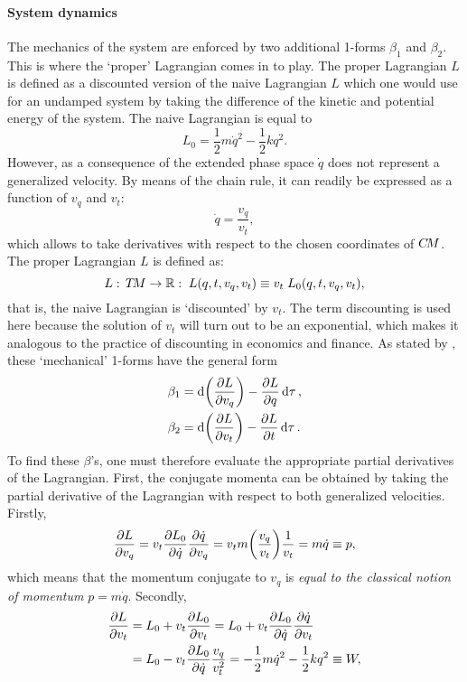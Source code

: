     \paragraph{System dynamics} The mechanics of the system are enforced by two additional 1-forms $\beta_1$ and $\beta_2$. This is where the `proper' Lagrangian comes in to play. The proper Lagrangian $L$ is defined as a discounted version of the naive Lagrangian $L$ which one would use for an undamped system by taking the difference of the kinetic and potential energy of the system. The naive Lagrangian is equal to $$ L_0 = \frac{1}{2}m\dot{q}^2 - \frac{1}{2}kq^2. $$
    However, as a consequence of the extended phase space $\dot{q}$ does not represent a generalized velocity. By means of the chain rule, it can readily be expressed as a function of $v_q$ and $v_t$:
    $$ \dot{q} = \frac{v_q}{v_t}, $$
    which allows to take derivatives with respect to the chosen coordinates of $C\!M$. The proper Lagrangian $L$ is defined as:
        $$ L:\,T\!M\to\mathbb{R}:\;L(q, t, v_q, v_t) \equiv v_t \; L_0(q, t, v_q, v_t), $$
    that is, the naive Lagrangian is `discounted' by $v_t$. The term discounting is used here because the solution of $v_t$ will turn out to be an exponential, which makes it analogous to the practice of discounting in economics and finance. As stated by \citet{Burke1985}, these `mechanical' 1-forms have the general form
    \begin{equation}
        \begin{split}
            \beta_1 &= \dd{\qty(\pdv{L}{v_q})} - \pdv{L}{q}\dd{\tau}, \\
            \beta_2 &= \dd{\qty(\pdv{L}{v_t})} - \pdv{L}{t}\dd{\tau}. \\
        \end{split}
    \end{equation}
    To find these $\beta$'s, one must therefore evaluate the appropriate partial derivatives of the Lagrangian. First, the conjugate momenta can be obtained by taking the partial derivative of the Lagrangian with respect to both generalized velocities. Firstly, 
    \begin{equation}
        \pdv{L}{v_q} = v_t \pdv{L_0}{\dot{q}}\pdv{\dot{q}}{v_q} = v_t m \qty(\frac{v_q}{v_t}) \frac{1}{v_t} = m\dot{q} \equiv p,
        \label{eq:dho_lag_v_q}
    \end{equation} 
    which means that the momentum conjugate to $v_q$ is \emph{equal to the classical notion of momentum} $p = m\dot{q}$.
    Secondly,
    \begin{equation}
        \begin{split}
            \pdv{L}{v_t} &= L_0 + v_t\pdv{L_0}{v_t} = L_0 + v_t\pdv{L_0}{\dot{q}}\pdv{\dot{q}}{v_t} \\
                         &= L_0 - v_t\pdv{L_0}{\dot{q}}\frac{v_q}{v_t^2} = -\frac{1}{2}m\dot{q}^2 - \frac{1}{2}kq^2 \equiv W,
            \label{eq:dho_lag_v_t}
        \end{split}
    \end{equation}
